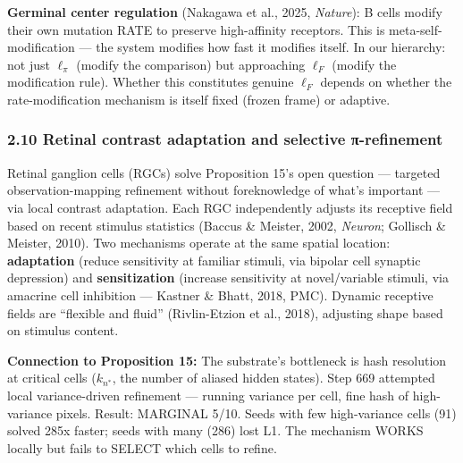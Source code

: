 \documentclass[
  11pt,
]{article}
\begin{document}
\textbf{Germinal center regulation} (Nakagawa et al., 2025,
\emph{Nature}): B cells modify their own mutation RATE to preserve
high-affinity receptors. This is meta-self-modification --- the system
modifies how fast it modifies itself. In our hierarchy: not just
\(\ell_\pi\) (modify the comparison) but approaching \(\ell_F\) (modify
the modification rule). Whether this constitutes genuine \(\ell_F\)
depends on whether the rate-modification mechanism is itself fixed
(frozen frame) or adaptive.

\subsubsection{2.10 Retinal contrast adaptation and selective
π-refinement}\label{retinal-contrast-adaptation-and-selective-ux3c0-refinement}

Retinal ganglion cells (RGCs) solve Proposition 15's open question ---
targeted observation-mapping refinement without foreknowledge of what's
important --- via local contrast adaptation. Each RGC independently
adjusts its receptive field based on recent stimulus statistics (Baccus
\& Meister, 2002, \emph{Neuron}; Gollisch \& Meister, 2010). Two
mechanisms operate at the same spatial location: \textbf{adaptation}
(reduce sensitivity at familiar stimuli, via bipolar cell synaptic
depression) and \textbf{sensitization} (increase sensitivity at
novel/variable stimuli, via amacrine cell inhibition --- Kastner \&
Bhatt, 2018, PMC). Dynamic receptive fields are ``flexible and fluid''
(Rivlin-Etzion et al., 2018), adjusting shape based on stimulus content.

\textbf{Connection to Proposition 15:} The substrate's bottleneck is
hash resolution at critical cells (\(k_{n^*}\), the number of aliased
hidden states). Step 669 attempted local variance-driven refinement ---
running variance per cell, fine hash of high-variance pixels. Result:
MARGINAL 5/10. Seeds with few high-variance cells (91) solved 285x
faster; seeds with many (286) lost L1. The mechanism WORKS locally but
fails to SELECT which cells to refine.
\end{document}
